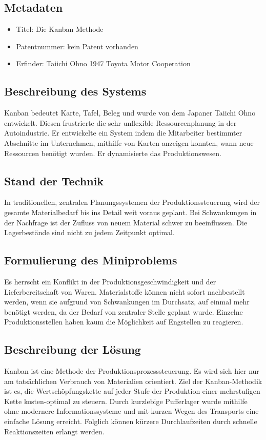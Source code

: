 \documentclass[11pt,a4paper]{article}
\begin{document}
\subsection{Metadaten}
\begin{itemize}\itemsep0pt
\item Titel: Die Kanban Methode
\item Patentnummer: kein Patent vorhanden
\item Erfinder:  Taiichi Ohno 1947 Toyota Motor Cooperation

\end{itemize}
\subsection{Beschreibung des Systems}
Kanban bedeutet Karte, Tafel, Beleg und wurde von dem Japaner Taiichi Ohno
entwickelt. Diesen frustrierte die sehr unflexible Ressourcenplanung in der
Autoindustrie. Er entwickelte ein System indem die Mitarbeiter bestimmter
Abschnitte im Unternehmen, mithilfe von Karten anzeigen konnten, wann neue
Ressourcen benötigt wurden. Er dynamisierte das Produktionswesen.
\subsection{Stand der Technik}
In traditionellen, zentralen Planungssystemen der Produktionssteuerung wird
der gesamte Materialbedarf bis ins Detail weit voraus geplant. Bei
Schwankungen in der Nachfrage ist der Zufluss von neuem Material schwer zu
beeinflussen. Die Lagerbestände sind nicht zu jedem Zeitpunkt optimal.

\subsection{Formulierung des Miniproblems}
Es herrscht ein Konflikt in der Produktionsgeschwindigkeit und der
Lieferbereitschaft von Waren.  Materialstoffe können nicht sofort nachbestellt
werden, wenn sie aufgrund von Schwankungen im Durchsatz, auf einmal mehr
benötigt werden, da der Bedarf von zentraler Stelle geplant wurde. Einzelne
Produktionsstellen haben kaum die Möglichkeit auf Engstellen zu reagieren.
\subsection{Beschreibung der Lösung}

Kanban ist eine Methode der Produktionsprozesssteuerung. Es wird sich hier nur
am tatsächlichen Verbrauch von Materialien orientiert. Ziel der
Kanban-Methodik ist es, die Wertschöpfungskette auf jeder Stufe der Produktion
einer mehrstufigen Kette kosten-optimal zu steuern. Durch kurzlebige
Pufferlager wurde mithilfe ohne modernere Informationssysteme und mit kurzen
Wegen des Transports eine einfache Lösung erreicht.  Folglich können kürzere
Durchlaufzeiten durch schnelle Reaktionszeiten erlangt werden.
\end{document}
